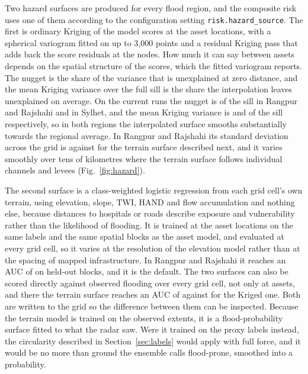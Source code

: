 \documentclass[11pt]{article}
\begin{document}
Two hazard surfaces are produced for every flood region, and the composite risk uses one of them according to the configuration setting \texttt{risk.hazard\_source}. The first is ordinary Kriging of the model scores at the asset locations, with a spherical variogram fitted on up to 3,000 points and a residual Kriging pass that adds back the score residuals at the nodes. How much it can say between assets depends on the spatial structure of the scores, which the fitted variogram reports. The nugget is the share of the variance that is unexplained at zero distance, and the mean Kriging variance over the full sill is the share the interpolation leaves unexplained on average. On the current runs the nugget is \RRNuggetSillRatio{} of the sill in Rangpur and Rajshahi and \SylhetNuggetSillRatio{} in Sylhet, and the mean Kriging variance is \RRKrigingSillRatio{} and \SylhetKrigingSillRatio{} of the sill respectively, so in both regions the interpolated surface smooths substantially towards the regional average. In Rangpur and Rajshahi its standard deviation across the grid is \RRKrigedGridSD{} against \RRTerrainGridSD{} for the terrain surface described next, and it varies smoothly over tens of kilometres where the terrain surface follows individual channels and levees (Fig.~\ref{fig:hazard}).

The second surface is a class-weighted logistic regression from each grid cell's own terrain, using elevation, slope, TWI, HAND and flow accumulation and nothing else, because distances to hospitals or roads describe exposure and vulnerability rather than the likelihood of flooding. It is trained at the asset locations on the same labels and the same spatial blocks as the asset model, and evaluated at every grid cell, so it varies at the resolution of the elevation model rather than at the spacing of mapped infrastructure. In Rangpur and Rajshahi it reaches an AUC of \RRHazardAUC{} on held-out blocks, and it is the default. The two surfaces can also be scored directly against observed flooding over every grid cell, not only at assets, and there the terrain surface reaches an AUC of \RRSurfaceTerrainObsAUC{} against \RRSurfaceKrigedObsAUC{} for the Kriged one. Both are written to the grid so the difference between them can be inspected. Because the terrain model is trained on the observed extents, it is a flood-probability surface fitted to what the radar saw. Were it trained on the proxy labels instead, the circularity described in Section~\ref{sec:labels} would apply with full force, and it would be no more than ground the ensemble calls flood-prone, smoothed into a probability.
\end{document}
